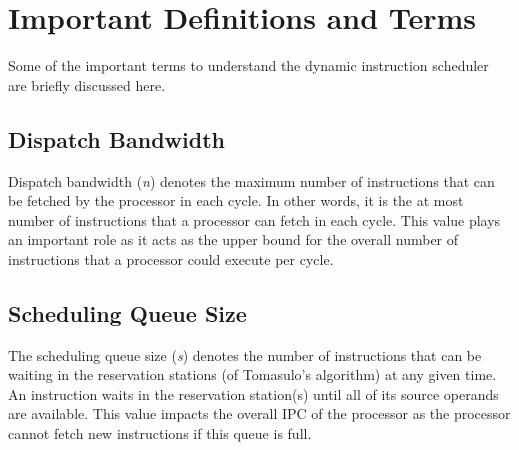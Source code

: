 \section{Important Definitions and Terms}
Some of the important terms to understand the dynamic instruction scheduler are briefly discussed here.

\subsection{Dispatch Bandwidth}
Dispatch bandwidth (\textit{n}) denotes the maximum number of instructions that can be fetched by the processor in each cycle. In other words, it is the at most number of instructions that a processor can fetch in each cycle. This value plays an important role as it acts as the upper bound for the overall number of instructions that a processor could execute per cycle. 


\subsection{Scheduling Queue Size}
The scheduling queue size (\textit{s}) denotes the number of instructions that can be waiting in the reservation stations (of Tomasulo's algorithm) at any given time. An instruction waits in the reservation station(s) until all of its source operands are available. This value impacts the overall IPC of the processor as the processor cannot fetch new instructions if this queue is full.